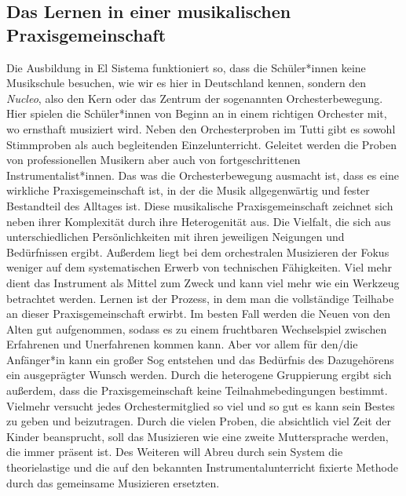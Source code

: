 \subsection{Das Lernen in einer musikalischen Praxisgemeinschaft}
Die Ausbildung in El Sistema funktioniert so, dass die Schüler*innen keine Musikschule
besuchen, wie wir es hier in Deutschland kennen, sondern den \emph{Nucleo}, also
den Kern oder das Zentrum der sogenannten Orchesterbewegung. Hier spielen die
Schüler*innen von Beginn an in einem richtigen Orchester mit, wo ernsthaft musiziert
wird. Neben den Orchesterproben im Tutti gibt es sowohl Stimmproben als auch
begleitenden Einzelunterricht. Geleitet werden die Proben von professionellen
Musikern aber auch von fortgeschrittenen Instrumentalist*innen.
\autocite[45]{kaufmann:el_sistema} 
Das was die Orchesterbewegung ausmacht ist, dass es eine wirkliche
Praxisgemeinschaft ist, in der die Musik allgegenwärtig und fester Bestandteil
des Alltages ist. Diese musikalische Praxisgemeinschaft zeichnet sich neben
ihrer Komplexität durch ihre Heterogenität aus. Die Vielfalt, die sich aus
unterschiedlichen Persönlichkeiten mit ihren jeweiligen Neigungen und
Bedürfnissen ergibt. \autocite[161]{roebke_mantilla:vom_wilden_lernen} Außerdem
liegt bei dem orchestralen Musizieren der Fokus weniger auf dem systematischen
Erwerb von technischen Fähigkeiten. Viel mehr dient das Instrument als Mittel
zum Zweck und kann viel mehr wie ein Werkzeug betrachtet werden. Lernen ist
der Prozess, in dem man die vollständige Teilhabe an dieser Praxisgemeinschaft
erwirbt. Im besten Fall werden die Neuen von den Alten gut aufgenommen, sodass
es zu einem fruchtbaren Wechselspiel zwischen Erfahrenen und Unerfahrenen kommen
kann. Aber vor allem für den/die Anfänger*in kann ein großer Sog entstehen und das
Bedürfnis des Dazugehörens ein ausgeprägter Wunsch werden. Durch die heterogene
Gruppierung ergibt sich außerdem, dass die Praxisgemeinschaft keine
Teilnahmebedingungen bestimmt. Vielmehr versucht jedes Orchestermitglied so viel
und so gut es kann sein Bestes zu geben und beizutragen. Durch die vielen
Proben, die absichtlich viel Zeit der Kinder beansprucht, soll das Musizieren
wie eine zweite Muttersprache werden, die immer präsent ist.
\autocite[162]{kaufmann:el_sistema} Des Weiteren will Abreu durch sein System die
theorielastige und die auf den bekannten Instrumentalunterricht fixierte Methode
durch das gemeinsame Musizieren ersetzten. 
\autocite[45]{kaufmann:el_sistema}




